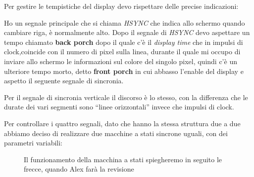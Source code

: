 Per gestire le tempistiche del display devo rispettare delle precise indicazioni:

Ho un segnale principale che si chiama \textit{HSYNC} che indica allo schermo quando cambiare riga, \`e normalmente alto. Dopo il segnale di \textit{HSYNC} devo aspettare un tempo chiamato \textbf{back porch} dopo il quale c'\`e il \textit{display time} che in impulsi di clock,coincide con il numero di pixel sulla linea, durante il quale mi occupo di inviare allo schermo le informazioni sul colore del singolo pixel, quindi c'\`e un ulteriore tempo morto, detto \textbf{front porch} in cui abbasso l'enable del display e aspetto il seguente segnale di sincronia.

Per il segnale di sincronia verticale il discorso \`e lo stesso, con la differenza che le durate dei vari segmenti sono ``linee orizzontali'' invece che impulsi di clock.

Per controllare i quattro segnali, dato che hanno la stessa struttura due a due abbiamo deciso di realizzare due macchine a stati sincrone uguali, con dei parametri variabili:

\begin{figure}[hbt]
	\centering
{}
\caption{Il funzionamento della macchina a stati spiegheremo in seguito le frecce, quando Alex far\`a la revisione}
\end{figure}

%